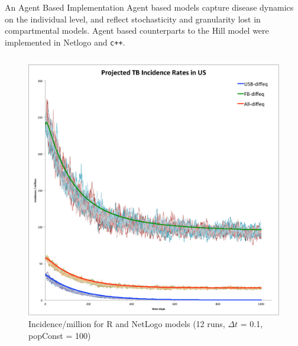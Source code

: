 \documentclass[final]{beamer}
\begin{document}
\begin{frame}
\begin{columns}
\begin{column}{.3\textwidth}
      \vspace{-.5em}
      \begin{block}{An Agent Based Implementation}
        Agent based models capture disease dynamics on the individual level, and
        reflect stochasticity and granularity lost in compartmental models.
        Agent based counterparts to the Hill model were implemented in Netlogo
        and \texttt{c++}.
        \begin{block}{}
          \vspace{-2em}
          \begin{column}{.45\textwidth}
            \begin{figure}[h]
              \begin{center}
                \includegraphics[width=\textwidth]{NLHMinc}
              \end{center}
              \caption{Incidence/million for R and NetLogo models (12 runs, $\Delta t$ = 0.1, popConst = 100)}
              \label{fig:NLHMinc}
            \end{figure}
          \end{column}
          \begin{column}{.45\textwidth}
            \begin{figure}[h]
              \begin{center}

\end{center}
\end{figure}
\end{column}
\end{block}
\end{block}
\end{column}
\end{columns}
\end{frame}
\end{document}
